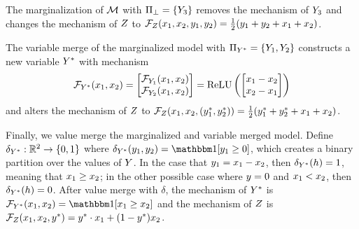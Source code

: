 \documentclass[twoside,11pt]{article}
\begin{document}
\begin{example}
{
}

The marginalization of $\mathcal{M}$ with $\Pi_\bot = \{Y_3\}$ removes the mechanism of $Y_3$ and changes the mechanism of $Z$ to $\mathcal{F}_{Z}(x_1, x_2,y_1, y_2) = \frac{1}{2}(y_1 + y_2 + x_1 + x_2)$.

The variable merge of the marginalized model with $\Pi_{Y^*} = \{Y_1, Y_2\}$ constructs a new variable $Y^*$ with mechanism 
\[\mathcal{F}_{Y^*}(x_1, x_2) = \begin{bmatrix}
    \mathcal{F}_{Y_1}(x_1, x_2) \\
    \mathcal{F}_{Y_2}(x_1, x_2)
\end{bmatrix} = \text{ReLU} \left( \begin{bmatrix}
    x_1 - x_2 \\
    x_2 - x_1
\end{bmatrix} \right)\]
and alters the mechanism of $Z$ to $\mathcal{F}_{Z}( x_1, x_2,(y^*_1, y^*_2)) = \frac{1}{2}(y^*_1 + y^*_2 + x_1 + x_2)$.

Finally, we value merge the marginalized and variable merged model. Define $\delta_{Y^*} : \mathbb{R}^2 \to \{0, 1\}$ where $\delta_{\onevarr^*}(\onevall_1, \onevall_2) = \indicator{\onevall_1 \geq 0}$, which creates a binary partition over the values of $Y$. In the case that $y_1 =x_1 - x_2 $, then $\delta_{Y^*}(h) = 1$, meaning that $x_1 \geq x_2$; in the other possible case where $y = 0$ and $x_1 < x_2$, then $\delta_{Y^*}(h) = 0$. After value merge with $\delta$, the mechanism of $Y^*$ is $\mechanism{\onevarr^*}(\oneval_1, \oneval_2) = \indicator{\oneval_1 \geq \oneval_2}$ and the mechanism of $Z$ is $\mathcal{F}_{Z}( x_1, x_2,y^*) = y^* \cdot x_1 + (1 - y^*)x_2$.
\end{example}
\end{document}
